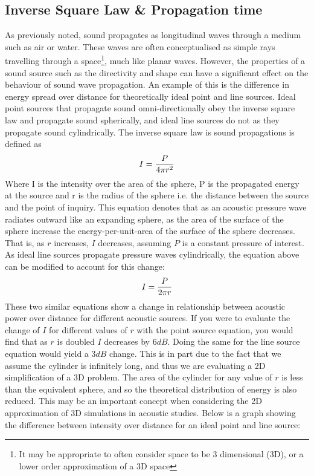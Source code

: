 \subsection{Inverse Square Law \& Propagation time}
As previously noted, sound propagates as longitudinal waves through a medium such as air or water. These waves are often conceptualised as simple rays~\cite{beranek1954acoustics} travelling through a space\footnote{It may be appropriate to often consider space to be 3 dimensional (3D), or a lower order approximation of a 3D space}, much like planar waves. However, the properties of a sound source such as the directivity and shape can have a significant effect on the behaviour of sound wave propagation. An example of this is the difference in energy spread over distance for theoretically ideal point and line sources. Ideal point sources that propagate sound omni-directionally obey the inverse square law and propagate sound spherically, and ideal line sources do not as they propagate sound cylindrically. The inverse square law is sound propagations is defined as~\cite{Davis2014}\\
\begin{equation}
I = \frac{P}{4 \pi r^2}\\
\end{equation}
Where I is the intensity over the area of the sphere, P is the propagated energy at the source and r is the radius of the sphere i.e. the distance between the source and the point of inquiry. This equation denotes that as an acoustic pressure wave radiates outward like an expanding sphere, as the area of the surface of the sphere increase the energy-per-unit-area of the surface of the sphere decreases. That is, as $r$ increases, $ I $ decreases, assuming $ P $ is a constant pressure of interest.\\
As ideal line sources propagate pressure waves cylindrically, the equation above can be modified to account for this change:\\
\begin{equation}
I = \frac{P}{2 \pi r}\\
\end{equation}
These two similar equations show a change in relationship between acoustic power over distance for different acoustic sources. If you were to evaluate the change of $I$ for different values of $r$ with the point source equation, you would find that as $r$ is doubled $I$ decreases by $6dB$. Doing the same for the line source equation would yield a $3dB$ change. This is in part due to the fact that we assume the cylinder is infinitely long, and thus we are evaluating a 2D simplification of a 3D problem. The area of the cylinder for any value of $r$ is less than the equivalent sphere, and so the theoretical distribution of energy is also reduced. This may be an important concept when considering the 2D approximation of 3D simulations in acoustic studies. Below is a graph showing the difference between intensity over distance for an ideal point and line source:\\

